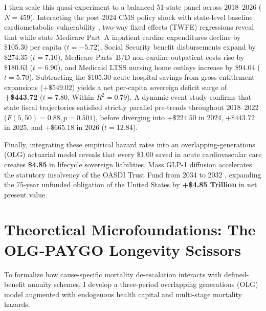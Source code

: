 \documentclass[11pt,a4paper]{article}
\begin{document}
I then scale this quasi-experiment to a balanced 51-state panel across 2018--2026 ($N = 459$). Interacting the post-2024 CMS policy shock with state-level baseline cardiometabolic vulnerability \citep{skinner2006geography,chetty2016association}, two-way fixed effects (TWFE) regressions reveal that while state Medicare Part~A inpatient cardiac expenditures decline by \$105.30 per capita ($t = -5.72$), Social Security benefit disbursements expand by \$274.35 ($t = 7.10$), Medicare Parts~B/D non-cardiac outpatient costs rise by \$180.63 ($t = 6.90$), and Medicaid LTSS nursing home outlays increase by \$94.04 ($t = 5.70$). Subtracting the \$105.30 acute hospital savings from gross entitlement expansions ($+\$549.02$) yields a net per-capita sovereign deficit surge of \textbf{+\$443.72} ($t = 7.80$, Within-$R^2 = 0.79$). A dynamic event study confirms that state fiscal trajectories satisfied strictly parallel pre-trends throughout 2018--2022 ($F(5, 50) = 0.88, p = 0.501$), before diverging into $+\$224.50$ in 2024, $+\$443.72$ in 2025, and $+\$665.18$ in 2026 ($t = 12.84$).

Finally, integrating these empirical hazard rates into an overlapping-generations (OLG) actuarial model \citep{samuelson1958exact,diamond1965national,bohn2001social} reveals that every \$1.00 saved in acute cardiovascular care creates \textbf{\$4.85} in lifecycle sovereign liabilities. Mass GLP-1 diffusion accelerates the statutory insolvency of the OASDI Trust Fund from 2034 to 2032 \citep{ssa2024trustees,cbo2024budget}, expanding the 75-year unfunded obligation of the United States by \textbf{+\$4.85 Trillion} in net present value.

\section{Theoretical Microfoundations: The OLG-PAYGO Longevity Scissors}
\label{sec:theory}
To formalize how cause-specific mortality de-escalation interacts with defined-benefit annuity schemes, I develop a three-period overlapping generations (OLG) model augmented with endogenous health capital and multi-stage mortality hazards.
\end{document}
